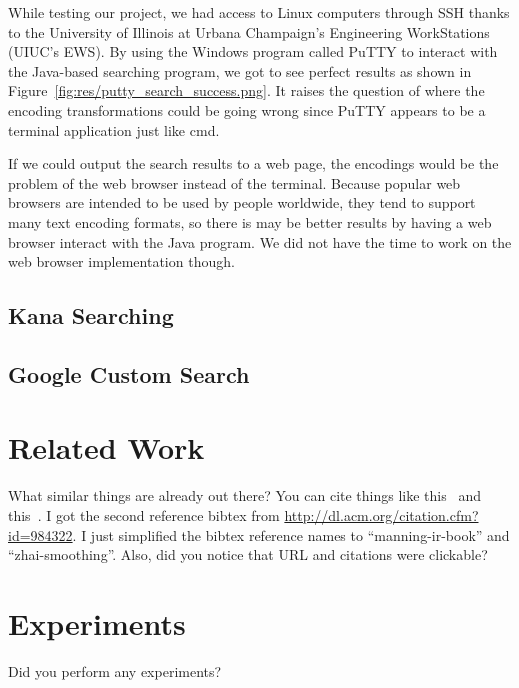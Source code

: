 \documentclass{acm} %
\begin{document}
\begin{CJK}{UTF8}{zhsong}

While testing our project, we had access to Linux computers through SSH thanks to the University of Illinois at Urbana Champaign's Engineering WorkStations (UIUC's EWS). By using the Windows program called PuTTY to interact with the Java-based searching program, we got to see perfect results as shown in Figure~\ref{fig:res/putty_search_success.png}. It raises the question of where the encoding transformations could be going wrong since PuTTY appears to be a terminal application just like cmd.


If we could output the search results to a web page, the encodings would be the problem of the web browser instead of the terminal. Because popular web browsers are intended to be used by people worldwide, they tend to support many text encoding formats, so there is may be better results by having a web browser interact with the Java program. We did not have the time to work on the web browser implementation though.

\subsection{Kana Searching}

\subsection{Google Custom Search}

\section{Related Work}

What similar things are already out there? You can cite things like
this~\cite{manning-ir-book} and this~\cite{zhai-smoothing}. I got the second
reference bibtex from \url{http://dl.acm.org/citation.cfm?id=984322}. I just
simplified the bibtex reference names to ``manning-ir-book'' and
``zhai-smoothing''. Also, did you notice that URL and citations were clickable?

\section{Experiments}

Did you perform any experiments?


\end{CJK}
\end{document}
